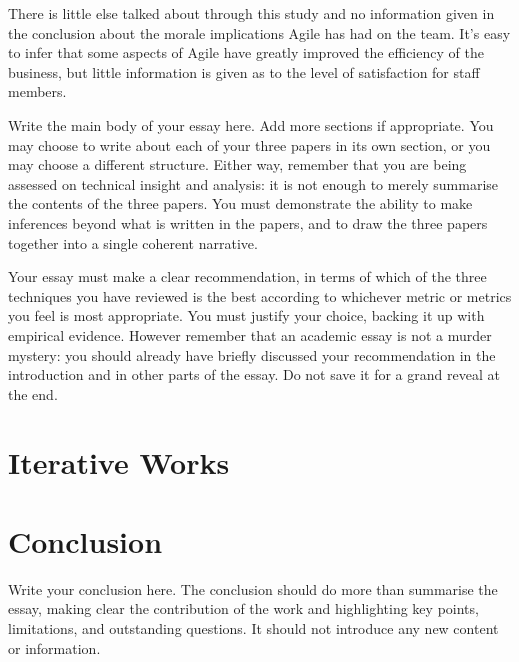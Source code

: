 \documentclass{scrartcl}
\begin{document}
There is little else talked about through this study and no information given in the conclusion about the morale implications Agile has had on the team. It's easy to infer that some aspects of Agile have greatly improved the efficiency of the business, but little information is given as to the level of satisfaction for staff members.

Write the main body of your essay here. Add more sections if appropriate. You may choose to write about each of your three papers in its own section, or you may choose a different structure. Either way, remember that you are being assessed on technical insight and analysis: it is not enough to merely summarise the contents of the three papers. You must demonstrate the ability to make inferences beyond what is written in the papers, and to draw the three papers together into a single coherent narrative.

Your essay must make a clear recommendation, in terms of which of the three techniques you have reviewed is the best according to whichever metric or metrics you feel is most appropriate. You must justify your choice, backing it up with empirical evidence. However remember that an academic essay is not a murder mystery: you should already have briefly discussed your recommendation in the introduction and in other parts of the essay. Do not save it for a grand reveal at the end. \cite{RyseCrisis}

\section{Iterative Works}


\section{Conclusion}

Write your conclusion here. The conclusion should do more than summarise the essay, making clear the contribution of the work and highlighting key points, limitations, and outstanding questions. It should not introduce any new content or information.



\end{document}
